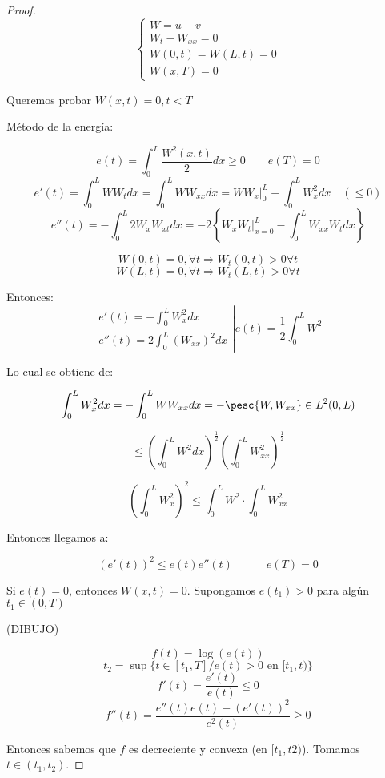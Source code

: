 		\begin{proof}

			\[\begin{cases}
				W = u-v\\
				W_t - W_{xx} = 0 \\
				W(0,t) = W(L,t) = 0\\
				W(x,T) = 0
			\end{cases}\]

			Queremos probar $W(x,t) = 0, t < T$

			Método de la energía:

			\[ e(t) = \int_0^L \frac{W^2(x,t)}{2} dx \geq 0 \quad \quad e(T) = 0\]
			\[ e'(t) = \int_0^L WW_t dx = \int_0^L W W_{xx} dx = \left. W W_x \right|_0^L - \int_0^L W^2_x dx \quad (\leq 0) \]
			\[ e''(t) = - \int^L_0 2W_x W_{xt} dx = -2 \left\{ \left. W_x W_t \right|^L_{x=0} - \int_0^L W_{xx} W_t dx \right\} \]

			\[W(0,t)  = 0, \forall t \Rightarrow  W_t(0,t) > 0 \forall t \]
			\[W(L,t)  = 0, \forall t \Rightarrow  W_t(L,t) > 0 \forall t \]

			Entonces:
			\[ \left. \begin{array}{r} e'(t) = - \int_0^L W^2_x dx \\
			 e''(t) = 2 \int_0^L (W_{xx})^2 dx \end{array} \right| e(t) = \frac{1}{2} \int_0^L W^2 \]

			Lo cual se obtiene de:

			\[ \int_0^L W^2_x dx = - \int_0^L W W_{xx} dx = - \pesc{W, W_{xx}} \in L^2(0,L)\]

			\[ \leq \left( \int_0^L W^2 dx  \right)^{\frac{1}{2}} \left( \int_0^L W^2_{xx}  \right)^{\frac{1}{2}}\]

			\[ \left( \int_0^L W^2_x  \right)^{2} \leq \int_0^L W^2 \cdot \int_0^L W_{xx}^2 \]

			Entonces llegamos a:

			\[ (e'(t))^2  \leq e(t) e''(t) \quad\quad\quad e(T) = 0 \]

			Si $e(t) = 0$, entonces $W(x,t) = 0$. Supongamos $e(t_1) > 0$ para algún $t_1 \in (0,T)$

			(DIBUJO)

			\[f(t) = \log (e(t))\]
			\[t_2 = \sup\{t \in [t_1,T] / e(t) > 0 \text{ en } [t_1,t)\}\]
			\[f'(t) = \frac{e'(t)}{e(t)} \leq 0\]
			\[f''(t) = \frac{e''(t) e(t)- (e'(t))^2}{e^2(t)} \geq 0\]

			Entonces sabemos que $f$ es decreciente y convexa (en $[t_1,t2)$). Tomamos $t \in ( t_1 , t_2 )$.


\end{proof}
